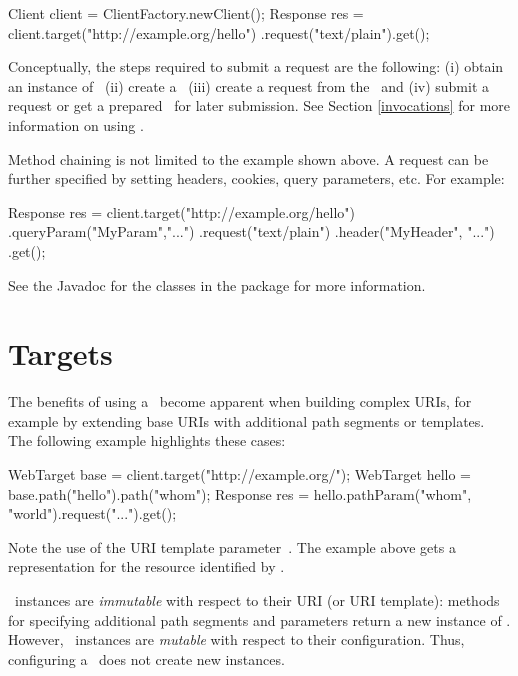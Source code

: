 \begin{listing}{1}
Client client = ClientFactory.newClient();
Response res = client.target("http://example.org/hello")
    .request("text/plain").get();
\end{listing}

Conceptually, the steps required to submit a request are the following: (i) obtain an instance of \Client\ (ii) create a \WebTarget\ (iii) create a request from the \WebTarget\ and (iv) submit a request or get a prepared \Invocation\ for later submission. See Section \ref{invocations} for more information on using \Invocation.

Method chaining is not limited to the example shown above. A request can be further specified by setting headers, cookies, query parameters, etc. For example:

\begin{listing}{1}
Response res = client.target("http://example.org/hello")
    .queryParam("MyParam","...")
    .request("text/plain")
    .header("MyHeader", "...")
    .get();
\end{listing}

See the Javadoc for the classes in the  package for more information.

\section{Targets}

The benefits of using a \WebTarget\ become apparent when building complex URIs, for example by extending base URIs with additional path segments or templates. The following example highlights these cases:

\begin{listing}{1}
WebTarget base = client.target("http://example.org/");
WebTarget hello = base.path("hello").path("{whom}");   
Response res = hello.pathParam("whom", "world").request("...").get();
\end{listing}

Note the use of the URI template parameter~. The example above gets a representation for the resource identified by .

\WebTarget\ instances are {\em immutable} with respect to their URI (or URI template): methods for specifying additional path segments and parameters return a new instance of \WebTarget. However, \WebTarget\ instances are {\em mutable} with respect to their configuration. Thus, configuring a \WebTarget\ does not create new instances.

